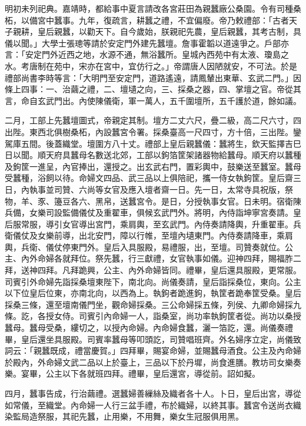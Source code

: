 明初未列祀典。嘉靖時，都給事中夏言請改各宮莊田為親蠶廠公桑園。令有司種桑柘，以備宮中蠶事。九年，復疏言，耕蠶之禮，不宜偏廢。帝乃敕禮部：「古者天子親耕，皇后親蠶，以勸天下。自今歲始，朕親祀先農，皇后親蠶，其考古制，具儀以聞。」大學士張璁等請於安定門外建先蠶壇。詹事霍韜以道遠爭之。戶部亦言：「安定門外近西之地，水源不通，無浴蠶所。皇城內西苑中有太液、瓊島之水。考唐制在苑中，宋亦在宮中，宜仿行之。」帝謂唐人因陋就安，不可法。於是禮部尚書李時等言：「大明門至安定門，道路遙遠，請鳳輦出東華、玄武二門。」因條上四事：一、治繭之禮，二、壇壝之向，三、採桑之器，四、掌壇之官。帝從其言，命自玄武門出。內使陳儀衛，軍一萬人，五千圍壇所，五千護於道，餘如議。

二月，工部上先蠶壇圖式，帝親定其制。壇方二丈六尺，疊二級，高二尺六寸，四出陛。東西北俱樹桑柘，內設蠶宮令署。採桑臺高一尺四寸，方十倍，三出陛。鑾駕庫五間。後蓋織堂。壇圍方八十丈。禮部上皇后親蠶儀：蠶將生，欽天監擇吉巳日以聞。順天府具蠶母名數送北郊，工部以鉤箔筐架諸器物給蠶母。順天府以蠶種及鉤筐一進呈，內官捧出，還授之。出玄武右門，置彩輿中，鼓樂送至蠶室。蠶母受蠶種，浴飼以待。命婦文四品、武三品以上俱陪祀，攜一侍女執鉤筐。皇后齋三日，內執事並司贊、六尚等女官及應入壇者齋一日。先一日，太常寺具祝版，祭物，羊、豕、籩豆各六、黑帛，送蠶宮令。是日，分授執事女官。日未明。宿衛陳兵備，女樂司設監備儀仗及重翟車，俱候玄武門外。將明，內侍詣坤寧宮奏請。皇后服常服，導引女官導出宮門，乘肩輿，至玄武門。內侍奏請降輿，升重翟車。兵衛儀仗及女樂前導，出北安門，障以行帷，至壇內壝東門。內侍奏請降車，乘肩輿，兵衛、儀仗停東門外。皇后入具服殿，易禮服，出，至壇。司贊奏就位。公主、內外命婦各就拜位。祭先蠶，行三獻禮，女官執事如儀。迎神四拜，賜福胙二拜，送神四拜。凡拜跪興，公主、內外命婦皆同。禮畢，皇后還具服殿，更常服。司賓引外命婦先詣採桑壇東陛下，南北向。尚儀奏請，皇后詣採桑位，東向。公主以下位皇后位東，亦南北向，以西為上。執鉤者跪進鉤，執筐者跪奉筐受桑。皇后採桑三條，還至壇南儀門坐，觀命婦採桑。三公命婦採五條，列侯、九卿命婦採九條。訖，各授女侍。司賓引內命婦一人，詣桑室，尚功率執鉤筐者從。尚功以桑授蠶母。蠶母受桑，縷切之，以授內命婦。內命婦食蠶，灑一箔訖，還。尚儀奏禮畢，皇后還坐具服殿。司賓率蠶母等叩頭訖，司贊唱班齊。外名婦序立定，尚儀致詞云：「親蠶既成，禮當慶賀。」四拜畢，賜宴命婦，並賜蠶母酒食。公主及內命婦於殿內，外命婦文武二品以上於臺上，三品以下於丹墀，尚食進膳。教坊司女樂奏樂。宴畢，公主以下各就班四拜。禮畢，皇后還宮，導從前。詔如擬。

四月，蠶事告成，行治繭禮。選蠶婦善繅絲及織者各十人。卜日，皇后出宮，導從如常儀，至織堂。內命婦一人行三盆手禮，布於織婦，以終其事。蠶宮令送尚衣織染監局造祭服，其祀先蠶，止用樂，不用舞，樂女生冠服俱用黑。

